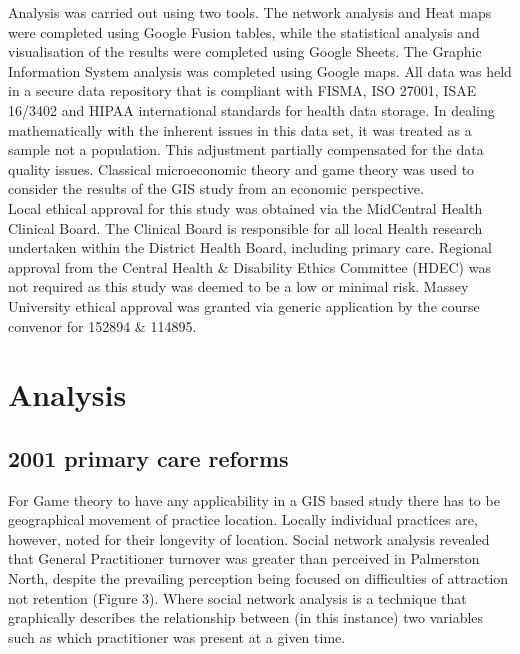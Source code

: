 \documentclass[11pt,a4paper]{article}
\begin{document}
Analysis was carried out using two tools. The network analysis and Heat maps were completed using Google Fusion tables, while the statistical analysis and visualisation of the results were completed using Google Sheets. The Graphic Information System analysis was completed using Google maps. All data was held in a secure data repository that is compliant with FISMA, ISO 27001, ISAE 16/3402 and HIPAA international standards for health data storage. In dealing mathematically  with the inherent issues in this data set, it was treated as a sample not a population. This adjustment partially compensated for the data quality issues. Classical microeconomic theory and game theory was used to consider the results of the GIS study from an economic perspective. \\

Local ethical approval for this study was obtained via the MidCentral Health Clinical Board. The Clinical Board is responsible for all local Health research undertaken within the District Health Board, including primary care.  Regional approval from the Central Health \& Disability Ethics Committee (HDEC) was not required as this study was deemed to be  a low or minimal risk. Massey University ethical approval was granted via generic application by the course convenor for 152894 & 114895. \\

\section{Analysis}
\subsection{2001 primary care reforms}
For Game theory to have any applicability in a GIS based study there has to be geographical movement of practice location. Locally individual practices are, however,  noted for their longevity of location. Social network analysis revealed that General Practitioner turnover was greater than perceived in Palmerston North, despite the prevailing perception being focused on difficulties of attraction not retention (Figure 3). Where social network analysis is a technique that graphically describes the relationship between (in this instance) two variables such as which practitioner was present at a given time.\\
\end{document}
